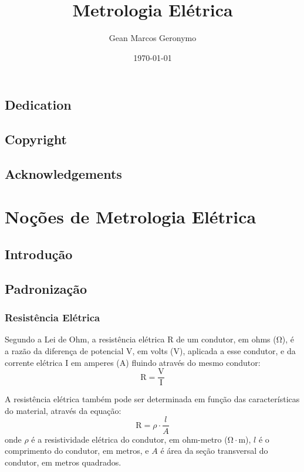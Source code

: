 \documentclass{book}
\title{Metrologia Elétrica}
\author{Gean Marcos Geronymo}
\date{\today}
\begin{document}
\maketitle

\frontmatter
\chapter{Dedication}
\chapter{Copyright}
\chapter{Acknowledgements}

\tableofcontents

\listoffigures
\listoftables

\mainmatter
\part{Noções de Metrologia Elétrica}


\chapter{Introdução}
\chapter{Padronização}
\section{Resistência Elétrica}

Segundo a Lei de Ohm, a resistência elétrica $\mathrm{R}$ de um condutor, em ohms ($\mathrm{\Omega}$), é a razão da diferença de potencial $\mathrm{V}$, em volts (V), aplicada a esse condutor, e da corrente elétrica $\mathrm{I}$ em amperes (A) fluindo através do mesmo condutor:
\begin{equation}
\mathrm{R} = \dfrac{\mathrm{V}}{\mathrm{I}}
\end{equation}

A resistência elétrica também pode ser determinada em função das características do material, através da equação:
\begin{equation}
  \mathrm{R} = \rho \cdot \dfrac{l}{A}
\end{equation}
onde $\rho$ é a resistividade elétrica do condutor, em ohm-metro ($\mathrm{\Omega} \cdot \mathrm{m}$), $l$ é o comprimento do condutor, em metros, e $A$ é área da seção transversal do condutor, em metros quadrados.
\end{document}
